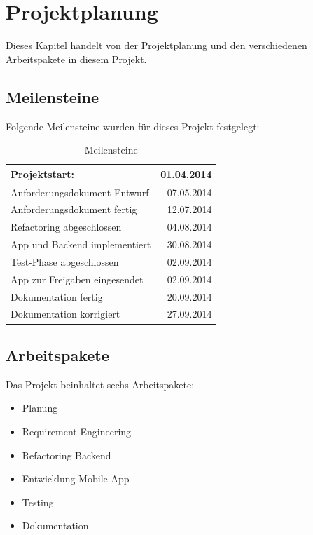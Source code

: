 %
%

\chapter{Projektplanung}\label{chap.projektplanung}
Dieses Kapitel handelt von der Projektplanung und den verschiedenen Arbeitspakete in diesem Projekt.

\section{Meilensteine}\label{meilensteine}
Folgende Meilensteine wurden für dieses Projekt festgelegt:

\begin{table}[ht]
\centering
  \begin{tabular}{ l | r }
	\hline
	\rowcolor{gray}
	Projektstart:					&	01.04.2014	\\ \hline
	Anforderungsdokument Entwurf		&	07.05.2014	\\ \hline
	Anforderungsdokument fertig		&	12.07.2014	\\ \hline
	Refactoring abgeschlossen		&	04.08.2014	\\ \hline
	App und Backend implementiert		& 	30.08.2014	\\ \hline
	Test-Phase abgeschlossen			&	02.09.2014	\\ \hline
	App zur Freigaben eingesendet		&	02.09.2014	\\ \hline
	Dokumentation fertig			&	20.09.2014	\\ \hline
	Dokumentation korrigiert			&	27.09.2014	\\ \hline
  \end{tabular}
   \caption{Meilensteine}\label{table:milestones}
\end{table}

\section{Arbeitspakete}\label{arbeitspakete}
Das Projekt beinhaltet sechs Arbeitspakete:
\begin{itemize}
\item Planung
\item Requirement Engineering
\item Refactoring Backend
\item Entwicklung Mobile App
\item Testing
\item Dokumentation
\end{itemize}


